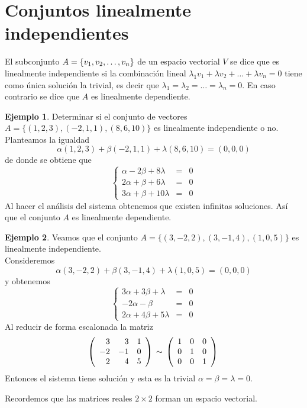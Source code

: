 \documentclass[10pt,a4paper]{report}
\theoremstyle{definition}
\newtheorem{ejemplo}{Ejemplo}[chapter]
\theoremstyle{remark}
\numberwithin{section}{chapter}
\numberwithin{equation}{chapter}
\numberwithin{tacounter}{chapter}
\begin{document}
\section{Conjuntos linealmente independientes}
El subconjunto $A=  \lbrace v_1, v_2, \ldots, v_n \rbrace$ de un espacio vectorial $V$ se dice que es linealmente independiente si la combinación lineal $\lambda_1 v_1 + \lambda v_2 + \ldots + \lambda v_n = 0$ tiene como única solución la trivial, es decir que $\lambda_1 = \lambda_2 = \ldots = \lambda_n = 0$. En caso contrario se dice que $A$ es linealmente dependiente.

\begin{ejemplo}

Determinar si el conjunto de vectores $A= \{(1,2,3),(-2,1,1),(8,6,10)\}$ es linealmente independiente o no.\\
Planteamos la igualdad 
$$\alpha (1,2,3) + \beta (-2,1,1) + \lambda (8,6,10) = (0,0,0)$$
de donde se obtiene que 
$$\left\{
\begin{array}{rcl}
\alpha - 2\beta +8 \lambda & = & 0\\
2 \alpha + \beta + 6\lambda & = & 0\\
3\alpha + \beta + 10 \lambda & = & 0
\end{array}
\right.$$
Al hacer el análisis del sistema obtenemos que existen infinitas soluciones. Así que el conjunto $A$ es linealmente dependiente.
\end{ejemplo}

\begin{ejemplo}
Veamos que el conjunto $A= \{(3,-2,2),(3,-1,4),(1,0,5)\}$ es linealmente independiente.\\
Consideremos $$\alpha (3,-2,2) + \beta (3,-1,4) + \lambda (1,0,5) = (0,0,0)$$
y obtenemos
$$\left\{
\begin{array}{rcl}
3 \alpha + 3 \beta + \lambda & = & 0\\
-2 \alpha - \beta & = &0\\
2 \alpha +4 \beta +5 \lambda & = & 0

\end{array}
\right.$$
Al reducir de forma escalonada la matriz
$$\left(
\begin{array}{rrr}
3 & 3 & 1\\
-2 & -1 & 0\\
2 & 4 & 5
\end{array}
\right)\\
\sim \\
\left(
\begin{array}{rrr}
1 & 0 & 0\\
0 & 1 &0\\
0 &0 &1
\end{array}
\right)\\$$
Entonces el sistema tiene solución y esta es la trivial $\alpha = \beta = \lambda = 0$.
\end{ejemplo}
Recordemos que las matrices reales $2 \times 2$ forman un espacio vectorial.
\end{document}
